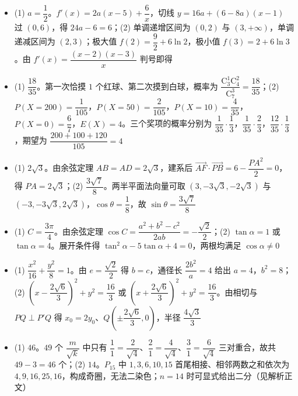 \begin{itemize}[leftmargin=2.6em]
  \item[\textbf{17.}] (1) $a=\dfrac12$。$f'(x)=2a(x-5)+\dfrac6x$，切线 $y=16a+(6-8a)(x-1)$ 过 $(0,6)$，得 $24a-6=6$；(2) 单调递增区间为 $(0,2)$ 与 $(3,+\infty)$，单调递减区间为 $(2,3)$；极大值 $f(2)=\dfrac92+6\ln2$，极小值 $f(3)=2+6\ln3$。由 $f'(x)=\dfrac{(x-2)(x-3)}x$ 判号即得
  \item[\textbf{18.}] (1) $\dfrac{18}{35}$。第一次恰摸 $1$ 个红球、第二次摸到白球，概率为 $\dfrac{\mathrm C_3^1\mathrm C_4^2}{\mathrm C_7^3}=\dfrac{18}{35}$；(2) $P(X=200)=\dfrac1{105}$，$P(X=50)=\dfrac2{105}$，$P(X=10)=\dfrac4{35}$，$P(X=0)=\dfrac67$，$E(X)=4$。三个奖项的概率分别为 $\dfrac1{35}\cdot\dfrac13$，$\dfrac1{35}\cdot\dfrac23$，$\dfrac{12}{35}\cdot\dfrac13$，期望为 $\dfrac{200+100+120}{105}=4$
  \item[\textbf{19.}] (1) $2\sqrt3$。由余弦定理 $AB=AD=2\sqrt3$，建系后 $\overrightarrow{AF}\cdot\overrightarrow{PB}=6-\dfrac{PA^2}2=0$，得 $PA=2\sqrt3$；(2) $\dfrac{3\sqrt7}8$。两半平面法向量可取 $(3,-3\sqrt3,-2\sqrt3)$ 与 $(-3,-3\sqrt3,2\sqrt3)$，$\cos\theta=\dfrac18$，故 $\sin\theta=\dfrac{3\sqrt7}8$
  \item[\textbf{20.}] (1) $C=\dfrac{3\pi}4$。由余弦定理 $\cos C=\dfrac{a^2+b^2-c^2}{2ab}=-\dfrac{\sqrt2}2$；(2) $\tan\alpha=1$ 或 $\tan\alpha=4$。展开条件得 $\tan^2\alpha-5\tan\alpha+4=0$，两根均满足 $\cos\alpha\neq0$
  \item[\textbf{21.}] (1) $\dfrac{x^2}{16}+\dfrac{y^2}8=1$。由 $e=\dfrac{\sqrt2}2$ 得 $b=c$，通径长 $\dfrac{2b^2}a=4$ 给出 $a=4$，$b^2=8$；(2) $\left(x-\dfrac{2\sqrt6}3\right)^2+y^2=\dfrac{16}3$ 或 $\left(x+\dfrac{2\sqrt6}3\right)^2+y^2=\dfrac{16}3$。由相切与 $PQ\perp P'Q$ 得 $x_0=2y_0$、$Q\left(\pm\dfrac{2\sqrt6}3,0\right)$，半径 $\dfrac{4\sqrt3}3$
  \item[\textbf{22.}] (1) $46$。$49$ 个 $\dfrac{m}{\sqrt k}$ 中只有 $\dfrac11=\dfrac2{\sqrt4}$、$\dfrac21=\dfrac4{\sqrt4}$、$\dfrac31=\dfrac6{\sqrt4}$ 三对重合，故共 $49-3=46$ 个；(2) $14$。$P_{15}$ 中 $1,3,6,10,15$ 首尾相接、相邻两数之和依次为 $4,9,16,25,16$，构成奇圈，无法二染色；$n=14$ 时可显式给出二分（见解析正文）
\end{itemize}
